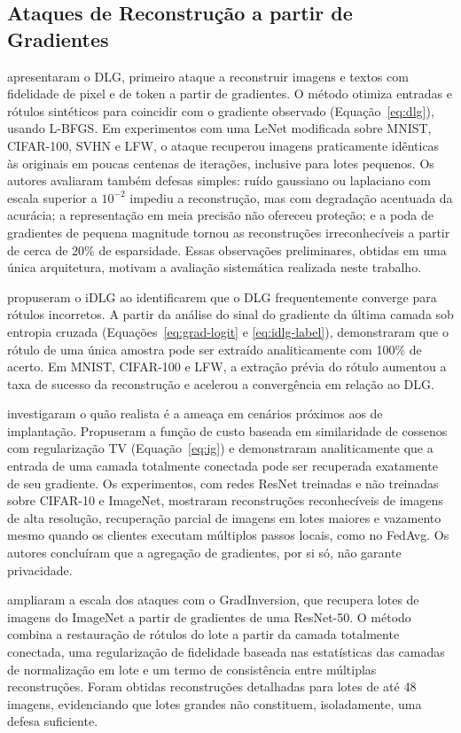 \subsection{Ataques de Reconstrução a partir de Gradientes}

 apresentaram o DLG, primeiro ataque a reconstruir imagens e textos com fidelidade de pixel e de token a partir de gradientes. O método otimiza entradas e rótulos sintéticos para coincidir com o gradiente observado (Equação~\ref{eq:dlg}), usando L-BFGS. Em experimentos com uma LeNet modificada sobre MNIST, CIFAR-100, SVHN e LFW, o ataque recuperou imagens praticamente idênticas às originais em poucas centenas de iterações, inclusive para lotes pequenos. Os autores avaliaram também defesas simples: ruído gaussiano ou laplaciano com escala superior a $10^{-2}$ impediu a reconstrução, mas com degradação acentuada da acurácia; a representação em meia precisão não ofereceu proteção; e a poda de gradientes de pequena magnitude tornou as reconstruções irreconhecíveis a partir de cerca de 20\% de esparsidade. Essas observações preliminares, obtidas em uma única arquitetura, motivam a avaliação sistemática realizada neste trabalho.

 propuseram o iDLG ao identificarem que o DLG frequentemente converge para rótulos incorretos. A partir da análise do sinal do gradiente da última camada sob entropia cruzada (Equações~\ref{eq:grad-logit} e \ref{eq:idlg-label}), demonstraram que o rótulo de uma única amostra pode ser extraído analiticamente com 100\% de acerto. Em MNIST, CIFAR-100 e LFW, a extração prévia do rótulo aumentou a taxa de sucesso da reconstrução e acelerou a convergência em relação ao DLG.

 investigaram o quão realista é a ameaça em cenários próximos aos de implantação. Propuseram a função de custo baseada em similaridade de cossenos com regularização TV (Equação~\ref{eq:ig}) e demonstraram analiticamente que a entrada de uma camada totalmente conectada pode ser recuperada exatamente de seu gradiente. Os experimentos, com redes ResNet treinadas e não treinadas sobre CIFAR-10 e ImageNet, mostraram reconstruções reconhecíveis de imagens de alta resolução, recuperação parcial de imagens em lotes maiores e vazamento mesmo quando os clientes executam múltiplos passos locais, como no FedAvg. Os autores concluíram que a agregação de gradientes, por si só, não garante privacidade.

 ampliaram a escala dos ataques com o GradInversion, que recupera lotes de imagens do ImageNet a partir de gradientes de uma ResNet-50. O método combina a restauração de rótulos do lote a partir da camada totalmente conectada, uma regularização de fidelidade baseada nas estatísticas das camadas de normalização em lote e um termo de consistência entre múltiplas reconstruções. Foram obtidas reconstruções detalhadas para lotes de até 48 imagens, evidenciando que lotes grandes não constituem, isoladamente, uma defesa suficiente.

